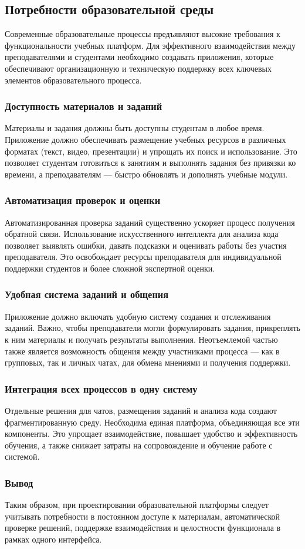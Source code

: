 \subsection{Потребности образовательной среды}

Современные образовательные процессы предъявляют высокие требования к функциональности учебных платформ. Для эффективного взаимодействия между преподавателями и студентами необходимо создавать приложения, которые обеспечивают организационную и техническую поддержку всех ключевых элементов образовательного процесса.

\subsubsection{Доступность материалов и заданий}
Материалы и задания должны быть доступны студентам в любое время. Приложение должно обеспечивать размещение учебных ресурсов в различных форматах (текст, видео, презентации) и упрощать их поиск и использование. Это позволяет студентам готовиться к занятиям и выполнять задания без привязки ко времени, а преподавателям — быстро обновлять и дополнять учебные модули.

\subsubsection{Автоматизация проверок и оценки}
Автоматизированная проверка заданий существенно ускоряет процесс получения обратной связи. Использование искусственного интеллекта для анализа кода позволяет выявлять ошибки, давать подсказки и оценивать работы без участия преподавателя. Это освобождает ресурсы преподавателя для индивидуальной поддержки студентов и более сложной экспертной оценки.

\subsubsection{Удобная система заданий и общения}
Приложение должно включать удобную систему создания и отслеживания заданий. Важно, чтобы преподаватели могли формулировать задания, прикреплять к ним материалы и получать результаты выполнения. Неотъемлемой частью также является возможность общения между участниками процесса — как в групповых, так и личных чатах, для обмена мнениями и получения поддержки.

\subsubsection{Интеграция всех процессов в одну систему}
Отдельные решения для чатов, размещения заданий и анализа кода создают фрагментированную среду. Необходима единая платформа, объединяющая все эти компоненты. Это упрощает взаимодействие, повышает удобство и эффективность обучения, а также снижает затраты на сопровождение и обучение работе с системой.

\subsubsection{Вывод}

Таким образом, при проектировании образовательной платформы следует учитывать потребности в постоянном доступе к материалам, автоматической проверке решений, поддержке взаимодействия и целостности функционала в рамках одного интерфейса.
